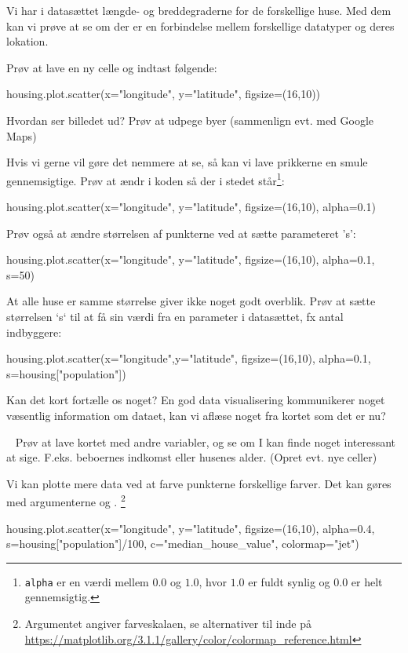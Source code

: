 \documentclass{ucph-handout}
\begin{document}
\begin{exercisebox}[adjusted title=Vis data som landkort]
Vi har i datasættet længde- og breddegraderne for de forskellige huse. Med dem kan vi prøve at se om der er en forbindelse mellem forskellige datatyper og deres lokation. 
\vspace{-3mm}

Prøv at lave en ny celle og indtast følgende:
\begin{python}
housing.plot.scatter(x="longitude", y="latitude", figsize=(16,10))
\end{python}
Hvordan ser billedet ud? Prøv at udpege byer (sammenlign evt. med Google Maps)

Hvis vi gerne vil gøre det nemmere at se, så kan vi lave prikkerne en smule gennemsigtige. Prøv at ændr i koden så der i stedet står\footnote{\texttt{alpha} er en værdi mellem $0.0$ og $1.0$, hvor $1.0$ er fuldt synlig og $0.0$ er helt gennemsigtig.}:
\begin{python}
housing.plot.scatter(x="longitude", y="latitude", figsize=(16,10), alpha=0.1)
\end{python}

Prøv også at ændre størrelsen af punkterne ved at sætte parameteret 's':
\begin{python}
housing.plot.scatter(x="longitude", y="latitude", figsize=(16,10),
                     alpha=0.1, s=50)
\end{python}
\vspace{-2mm}
At alle huse er samme størrelse giver ikke noget godt overblik. Prøv at sætte størrelsen `s` til at få sin værdi fra en parameter i datasættet, fx antal indbyggere:
\begin{python}
housing.plot.scatter(x="longitude",y="latitude", figsize=(16,10),
                     alpha=0.1, s=housing["population"])
\end{python}
Kan det kort fortælle os noget? En god data visualisering kommunikerer noget væsentlig information om dataet, kan vi aflæse noget fra kortet som det er nu?

\ \newline
Prøv at lave kortet med andre variabler, og se om I kan finde noget interessant at sige. F.eks. beboernes indkomst eller husenes alder. (Opret evt. nye celler)

Vi kan plotte mere data ved at farve punkterne forskellige farver. Det kan gøres med argumenterne  og . \footnote{Argumentet  angiver farveskalaen, se alternativer til  inde på \url{https://matplotlib.org/3.1.1/gallery/color/colormap_reference.html}}
\begin{python}
housing.plot.scatter(x="longitude", y="latitude", figsize=(16,10),
                    alpha=0.4, s=housing["population"]/100,
                    c="median_house_value", 
                    colormap="jet")
\end{python}


\end{exercisebox}
\end{document}
